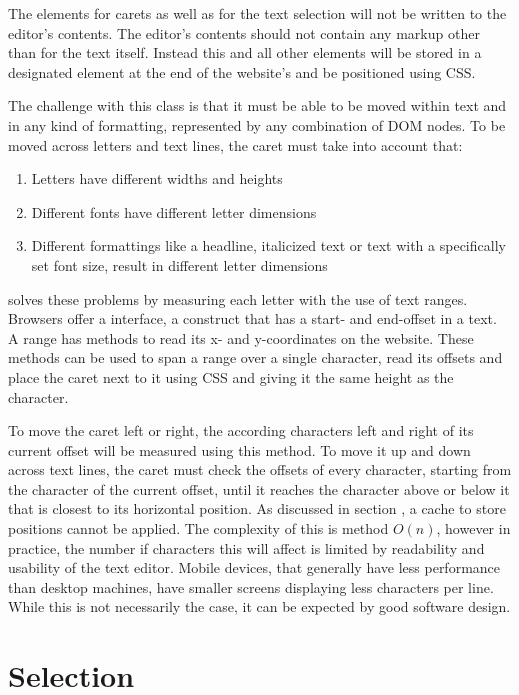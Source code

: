 The elements for carets as well as for the text selection will not be written to the editor's contents. The editor's contents should not contain any markup other than for the text itself. Instead this and all other elements will be stored in a designated  element at the end of the website's  and be positioned using CSS.

 The challenge with this class is that it must be able to be moved within text and in any kind of formatting, represented by any combination of DOM nodes. To be moved across letters and text lines, the caret must take into account that:

\begin{enumerate}
\item Letters have different widths and heights
\item Different fonts have different letter dimensions
\item Different formattings like a headline, italicized text or text with a specifically set font size, result in different letter dimensions
\end{enumerate}

 solves these problems by measuring each letter with the use of text ranges. Browsers offer a  interface, a construct that has a start- and end-offset in a text. A range has methods to read its x- and y-coordinates on the website. These methods can be used to span a range over a single character, read its offsets and place the caret next to it using CSS and giving it the same height as the character.

To move the caret left or right, the according characters left and right of its current offset will be measured using this method. To move it up and down across text lines, the caret must check the offsets of every character, starting from the character of the current offset, until it reaches the character above or below it that is closest to its horizontal position. As discussed in section , a cache to store positions cannot be applied. The complexity of this is method $O(n)$, however in practice, the number if characters this will affect is limited by readability and usability of the text editor. Mobile devices, that generally have less performance than desktop machines, have smaller screens displaying less characters per line. While this is not necessarily the case, it can be expected by good software design.

\section{Selection}

